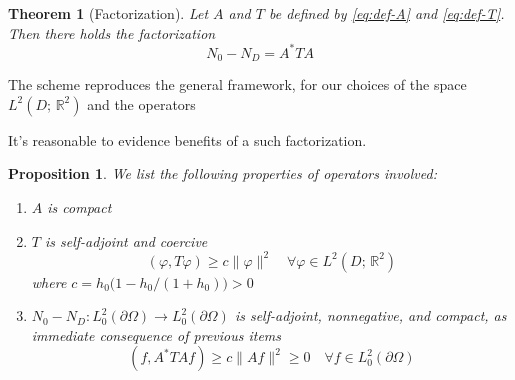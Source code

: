\documentclass[10pt, a4paper, twoside, openright]{book}
\theoremstyle{definition}
\theoremstyle{plain}
\newtheorem{theorem}[subsection]{Theorem}
\theoremstyle{plain}
\theoremstyle{plain}
\newtheorem{proposition}[subsection]{Proposition}
\theoremstyle{plain}
\theoremstyle{plain}
\theoremstyle{plain}
\theoremstyle{plain}
\theoremstyle{plain}
\let\phi\varphi
\begin{document}
\begin{theorem}[Factorization]
 Let $A$ and $T$ be defined by \eqref{eq:def-A} and \eqref{eq:def-T}. Then there holds the factorization
\begin{equation}
 {N_0} - {N_D} = A^*TA
\end{equation}
\end{theorem}
The scheme reproduces the general framework, for our choices of the space $L^2(D;\,\mathbb{R}^2)$ and the operators 
\begin{center}
\end{center}
It's reasonable to evidence benefits of a such factorization.
\begin{proposition}
 We list the following properties of operators involved:
 \begin{enumerate}
  \item $A$ is compact
  \item $T$ is self-adjoint and coercive
  \begin{equation}
   (\phi,T\phi)\geq c\|\phi\|^2\quad \forall \phi \in L^2(D;\,\mathbb{R}^2)
  \end{equation}
  where $c = h_0\Big(1-h_0/(1+h_0)\Big)>0$
  \item ${N_0} - {N_D}: L^2_0(\partial \Omega) \to L^2_0(\partial \Omega)$ is self-adjoint, nonnegative, and compact, as immediate consequence of previous items
  \begin{equation}
   (f,A^*TAf)\geq c\|Af\|^2\geq 0\quad \forall f \in L^2_0(\partial \Omega)
  \end{equation}  
 \end{enumerate}
\end{proposition}
\end{document}
